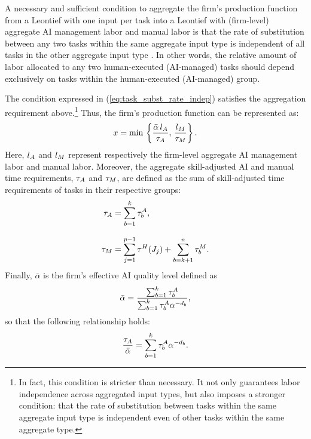 A necessary and sufficient condition to aggregate the firm's production function from a Leontief with one input per task into a Leontief with (firm-level) aggregate AI management labor and manual labor is that the rate of substitution between any two tasks within the same aggregate input type is independent of all tasks in the other aggregate input type \citep{leontief1947introduction, fisher1965embodied, felipe2003aggregation}.
In other words, the relative amount of labor allocated to any two human-executed (AI-managed) tasks should depend exclusively on tasks within the human-executed (AI-managed) group.

The condition expressed in (\ref{eq:task_subst_rate_indep}) satisfies the aggregation requirement above.\footnote{In fact, this condition is stricter than necessary. It not only guarantees labor independence across aggregated input types, but also imposes a stronger condition: that the rate of substitution between tasks within the same aggregate input type is independent even of other tasks within the same aggregate type.}
Thus, the firm's production function can be represented as:
\begin{equation}
x=\min\,\left\{\frac{\bar{\alpha}\,l_{A}}{\tau_{A}},\,\frac{l_{M}}{\tau_{M}}\right\}.\label{eq:micro_agg_prod}
\end{equation}
Here, $l_{A}$ and $l_{M}$ represent respectively the firm-level aggregate AI management labor and manual labor.
Moreover, the aggregate skill-adjusted AI and manual time requirements, $\tau_{A}$ and $\tau_{M}$, are defined as the sum of skill-adjusted time requirements of tasks in their respective groups:
\begin{align}
\tau_{A} & = \sum_{b=1}^{k}\tau^{A}_{b}, \label{eq:def_t_AI}\\[8pt]
\tau_{M} & = \sum_{j=1}^{p-1}\tau^{H}_{}(J_j) + \sum_{b=k+1}^{n}\tau^{M}_{b}. \label{eq:def_t_H}
\end{align}
Finally, $\bar{\alpha}$ is the firm's effective AI quality level defined as
\begin{equation}
\bar{\alpha}=\frac{\sum_{b=1}^{k}\tau^{A}_{b}}{\sum_{b=1}^{k}\tau^{A}_{b}\alpha^{-d_{b}}},\label{eq:alpha_bar}
\end{equation}
so that the following relationship holds:
\[
\frac{\tau_{A}}{\bar{\alpha}}=\sum_{b=1}^{k}\tau^{A}_{b}\alpha^{-d_{b}}.
\]

